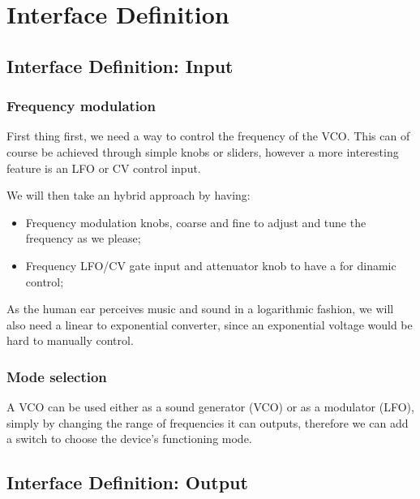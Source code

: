 \chapter{Interface Definition}


\section{Interface Definition: Input}

\subsection*{Frequency modulation}

First thing first, we need a way to control the frequency of the VCO.
This can of course be achieved through simple knobs or sliders, however a more
interesting feature is an LFO or CV control input.

We will then take an hybrid approach by having:

\begin{itemize}
    \item Frequency modulation knobs, coarse and fine to adjust and tune the frequency
          as we please;

    \item Frequency LFO/CV gate input and attenuator knob to have a for dinamic control;
\end{itemize}

As the human ear perceives music and sound in a logarithmic fashion, we will also need
a linear to exponential converter, since an exponential voltage would be hard to manually
control.

\subsection*{Mode selection}

A VCO can be used either as a sound generator (VCO) or as a modulator (LFO), simply by
changing the range of frequencies it can outputs, therefore we can add a switch to choose
the device's functioning mode.


\section{Interface Definition: Output}

